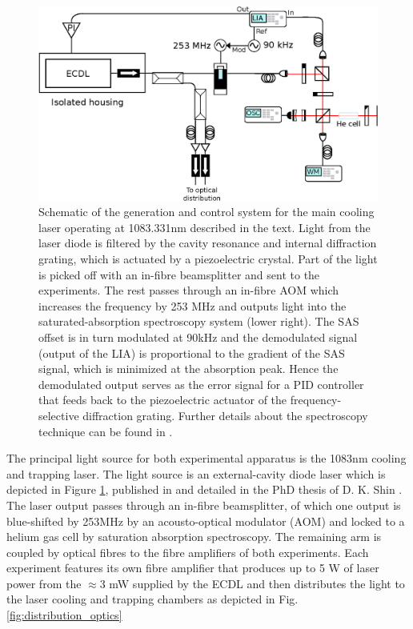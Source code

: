	\begin{figure}
		\centering
		\includegraphics[width=\textwidth]{fig/apparatus/master_laser_system}
		\caption{Schematic of the generation and control system for the main cooling laser operating at 1083.331nm described in the text. Light from the laser diode is filtered by the cavity resonance and internal diffraction grating, which is actuated by a piezoelectric crystal. Part of the light is picked off with an in-fibre beamsplitter and sent to the experiments. The rest passes through an in-fibre AOM which increases the frequency by 253 MHz and outputs light into the saturated-absorption spectroscopy system (lower right). The SAS offset is in turn modulated at 90kHz and the demodulated signal (output of the LIA) is proportional to the gradient of the SAS signal, which is minimized at the absorption peak. Hence the demodulated output serves as the error signal for a PID controller that feeds back to the piezoelectric actuator of the frequency-selective diffraction grating. Further details about the spectroscopy technique can be found in \cite{ShinThesis,FootAtomic}.}
		\label{fig:main_laser}
	\end{figure}
	The principal light source for both experimental apparatus is the 1083nm cooling and trapping laser.
	The light source is an external-cavity diode laser which is depicted in Figure \ref{fig:main_laser}, published in \cite{Shin16} and detailed in the PhD thesis of D. K.	Shin \cite{ShinThesis}.
	The laser output passes through an in-fibre beamsplitter, of which one output is blue-shifted by 253MHz by an acousto-optical modulator (AOM) and locked to a helium gas cell by saturation absorption spectroscopy.
	The remaining arm is coupled by optical fibres to the fibre amplifiers of both experiments.
	Each experiment features its own fibre amplifier that produces up to 5 W of laser power from the $\approx$3 mW supplied by the ECDL and then distributes the light to the laser cooling and trapping chambers as depicted in Fig. \ref{fig:distribution_optics}

